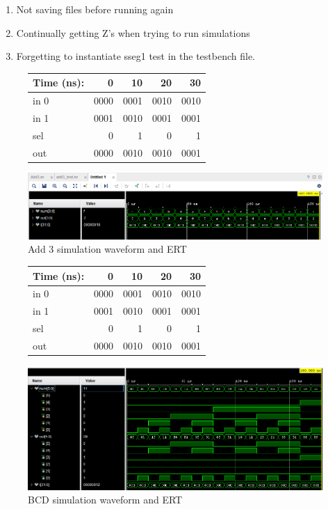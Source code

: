 \documentclass[11pt]{article}
\begin{document}
\begin{enumerate}
	
	\item Not saving files before running again
	
	
	
	\item Continually getting Z's when trying to run simulations
	
	
	
	\item Forgetting to instantiate sseg1 test in the testbench file.
	
	
	
\end{enumerate} 

\begin{figure}[ht]\centering
	\begin{tabular}{l|rrrr}
		Time (ns): & 0 & 10 & 20 & 30 \\
		\midrule 
		in 0 & 0000 & 0001 & 0010 & 0010 \\
		in 1 & 0001 & 0010 & 0001 & 0001 \\
		sel & 0 & 1 & 0 & 1 \\
		\bottomrule
		out & 0000 & 0010 &0010 &0001 
	\end{tabular}\medskip
	
	\includegraphics[width=1.0\textwidth]{Part1.PNG}
	\caption{Add 3 simulation waveform and ERT}
	\label{fig:sim_with_table}
\end{figure}

\begin{figure}[ht]\centering
	\begin{tabular}{l|rrrr}
		Time (ns): & 0 & 10 & 20 & 30 \\
		\midrule 
		in 0 & 0000 & 0001 & 0010 & 0010 \\
		in 1 & 0001 & 0010 & 0001 & 0001 \\
		sel & 0 & 1 & 0 & 1 \\
		\bottomrule
		out & 0000 & 0010 &0010 &0001 
	\end{tabular}\medskip
	
	\includegraphics[width=1.0\textwidth]{Part2.PNG}
	\caption{BCD simulation waveform and ERT}
	\label{fig:sim_with_table}
\end{figure}
\clearpage
\end{document}
